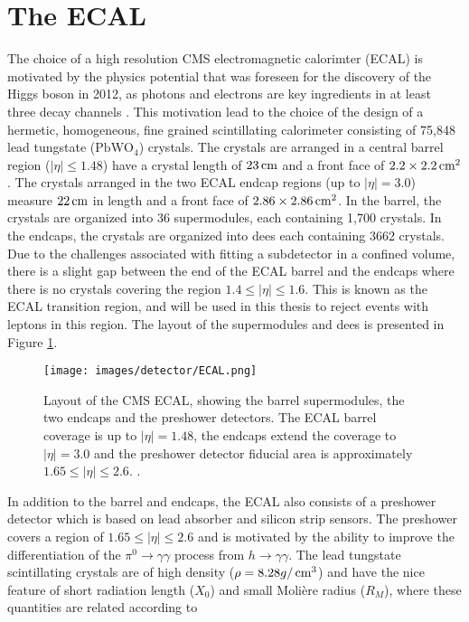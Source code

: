 \section{The ECAL}
\noindent\justify
The choice of a high resolution CMS electromagnetic calorimter (ECAL) is motivated by the physics potential that was foreseen for the discovery of the Higgs boson in 2012, as photons and electrons are key ingredients in at least three decay channels \cite{Cockerill:2008td}.
This motivation lead to the choice of the design of a hermetic, homogeneous, fine grained scintillating calorimeter consisting of 75,848 lead tungstate ($\mathrm{PbWO_{4}}$) crystals. 
The crystals are arranged in a central barrel region ($|\eta|\leq1.48$) have a crystal length of $23\,\text{cm}$ and a front face of $2.2\times2.2\,\text{cm}^{2}$. 
The crystals arranged in the two ECAL endcap regions (up to $|\eta|=3.0$) measure $22\,\text{cm}$ in length and a front face of $2.86\times2.86\,\text{cm}^{2}$. 
In the barrel, the crystals are organized into 36 supermodules, each containing 1,700 crystals. 
In the endcaps, the crystals are organized into dees each containing 3662 crystals. 
Due to the challenges associated with fitting a subdetector in a confined volume, there is a slight gap between the end of the ECAL barrel and the endcaps where there is no crystals covering the region $1.4\leq|\eta|\leq1.6$. This is known as the ECAL transition region, and will be used in this thesis to reject events with leptons in this region. 
The layout of the supermodules and dees is presented in Figure \ref{fig:ECAL}. 
\begin{figure}[!htp]
  \centering
   \texttt{[image: images/detector/ECAL.png]}
   \caption{Layout of the CMS ECAL, showing the barrel supermodules, the two endcaps and the preshower detectors. The ECAL barrel coverage is up to $|\eta|=1.48$, the endcaps extend the coverage to $|\eta|=3.0$ and the preshower detector fiducial area is approximately $1.65\leq|\eta|\leq2.6$. \cite{Chatrchyan:2013dga}.}
   \label{fig:ECAL}
\end{figure}                                                                                            
In addition to the barrel and endcaps, the ECAL also consists of a preshower detector which is based on lead absorber and silicon strip sensors. 
The preshower covers a region of $1.65\leq|\eta|\leq2.6$ and is motivated by the ability to improve the differentiation of the $\pi^{0}\rightarrow\gamma\gamma$ process from $h\rightarrow\gamma\gamma$. 
The lead tungstate scintillating crystals are of high density ($\rho=8.28g/\,\text{cm}^{3}$) and have the nice feature of short radiation length ($X_{0}$) and small Moli\`ere radius ($R_{M}$), where these quantities are related according to
